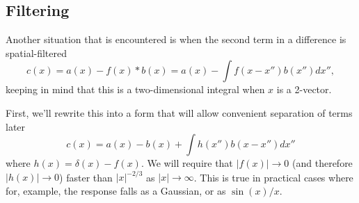 \documentclass[11pt, oneside]{article}   	%
\begin{document}
\begin{appendix}
\subsection{Filtering}
\label{append:filter}

Another situation that is encountered is when the second term in a difference is spatial-filtered
\begin{equation}
c(x) = a(x) - f(x) \ast b(x) = a(x) - \int f(x-x'') b(x'') d x'',
\end{equation}
keeping in mind that this is a two-dimensional integral when $x$ is a 2-vector.

First, we'll rewrite this into a form that will allow convenient separation of terms later
\begin{equation}
c(x) = a(x) - b(x) + \int h(x'') b(x-x'') d x''
\end{equation}
where $h(x) = \delta(x) - f(x)$. We will require that $\left|f(x)\right| \rightarrow 0$ (and therefore $\left|h(x)\right| \rightarrow 0$) faster than $\left|x\right|^{-2/3}$ as $\left|x\right| \rightarrow \infty$. This is true in practical cases where for, example, the response falls as a Gaussian, or as $\sin(x)/x$.


\end{appendix}
\end{document}

